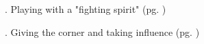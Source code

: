 \begin{minipage}[b][][b]{.5\textwidth}
\centering

\vspace{-0.6cm} . Playing with a "fighting spirit" (pg. \pageref{5-4:fight})
\end{minipage}%
\begin{minipage}[b][][b]{0.5\textwidth}
\centering

\vspace{-0.6cm} . Giving the corner and taking influence (pg. \pageref{5-4:influence-2})
\end{minipage}
